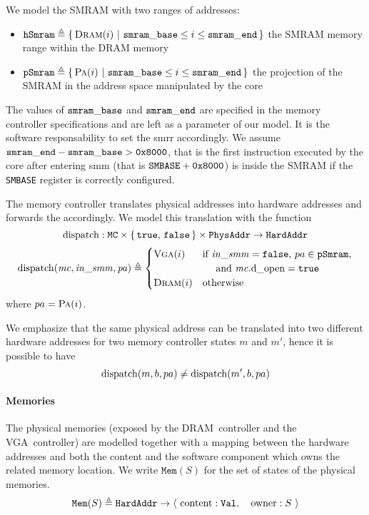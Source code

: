 We model the SMRAM with two ranges of addresses:
%
\begin{itemize}
\item
  $\texttt{hSmram} \triangleq \{\,\textsc{Dram}(i)\ |\ \mathtt{smram\_base} \leq i
    \le \mathtt{smram\_end}\,\}$ the SMRAM memory range within the DRAM memory
%
\item
  $\texttt{pSmram} \triangleq \{\,\textsc{Pa}(i)\ |\ \mathtt{smram\_base} \leq i
    \le \mathtt{smram\_end}\,\}$ the projection of the SMRAM in the address space
  manipulated by the core
\end{itemize}
%
The values of $\mathtt{smram\_base}$ and $\mathtt{smram\_end}$ are specified in the
memory controller specifications and are left as a parameter of our model.
%
It is the software responsability to set the \ac{smrr} accordingly.
%
We assume $\mathtt{smram\_end} - \mathtt{smram\_base} > \mathtt{0x8000}$, that is the
first instruction executed by the core after entering \ac{smm} (that is
$\texttt{SMBASE} + \mathtt{0x8000}$) is inside the SMRAM if the \texttt{SMBASE}
register is correctly configured.

The memory controller translates physical addresses into hardware addresses and
forwards the \IO accordingly.
%
We model this translation with the function
%
\[
  \mathrm{dispatch} : \texttt{MC} \times
  \{\,\mathtt{true},\,\mathtt{false}\,\} \times \texttt{PhysAddr} \rightarrow
  \texttt{HardAddr}
\]
%
\[
  \mathrm{dispatch}(\mathit{mc}, \mathit{in\_smm}, \mathit{pa}) \triangleq
  \begin{cases}
    \textsc{Vga}(i) & \text{if }\mathit{in\_smm} = \mathtt{false}\text{, }pa \in
    \texttt{pSmram}\text{,} \\
    & \quad\text{ and } \mathit{mc}.\mathrm{d\_open} = \mathtt{true}  \\
    \textsc{Dram}(i) & \text{otherwise}
  \end{cases}
\]
%
\qquad\qquad\qquad\qquad\qquad\qquad where $pa = \textsc{Pa}(i)$.

We emphasize that the same physical address can be translated into two different
hardware addresses for two memory controller states $m$ and $m'$, hence it is
possible to have
%
\[
  \mathrm{dispatch}(m, b, pa) \neq \mathrm{dispatch}(m', b, pa)
\]

\paragraph{Memories}
%
The physical memories (exposed by the DRAM controller and the VGA controller)
are modelled together with a mapping between the hardware addresses and both the
content and the software component which owns the related memory location.
%
We write $\texttt{Mem}(S)$ for the set of states of the physical memories.
\[
  \texttt{Mem}(S) \triangleq \texttt{HardAddr} \rightarrow
  \langle~\mathrm{content}: \texttt{Val},\quad\mathrm{owner}: S~\rangle
\]

